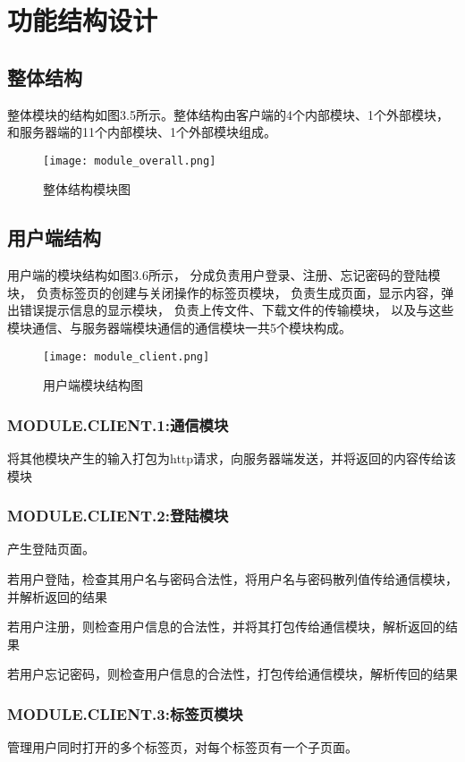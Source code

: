 \section{功能结构设计}
\subsection{整体结构}
整体模块的结构如图3.5所示。整体结构由客户端的4个内部模块、1个外部模块，和服务器端的11个内部模块、1个外部模块组成。

\begin{figure}[!ht] 
\centering 
\texttt{[image: module\_overall.png]} 
\caption{整体结构模块图}\label{fig:noted-figure}
\end{figure}

\subsection{用户端结构}
用户端的模块结构如图3.6所示，
分成负责用户登录、注册、忘记密码的登陆模块，
负责标签页的创建与关闭操作的标签页模块，
负责生成页面，显示内容，弹出错误提示信息的显示模块，
负责上传文件、下载文件的传输模块，
以及与这些模块通信、与服务器端模块通信的通信模块一共5个模块构成。
\begin{figure}[!h]  
\centering 
\texttt{[image: module\_client.png]} 
\caption{用户端模块结构图}\label{fig:noted-figure}
\end{figure}

\subsubsection{MODULE.CLIENT.1:通信模块}
将其他模块产生的输入打包为http请求，向服务器端发送，并将返回的内容传给该模块

\subsubsection{MODULE.CLIENT.2:登陆模块}
产生登陆页面。

若用户登陆，检查其用户名与密码合法性，将用户名与密码散列值传给通信模块，并解析返回的结果

若用户注册，则检查用户信息的合法性，并将其打包传给通信模块，解析返回的结果

若用户忘记密码，则检查用户信息的合法性，打包传给通信模块，解析传回的结果

\subsubsection{MODULE.CLIENT.3:标签页模块}
管理用户同时打开的多个标签页，对每个标签页有一个子页面。

